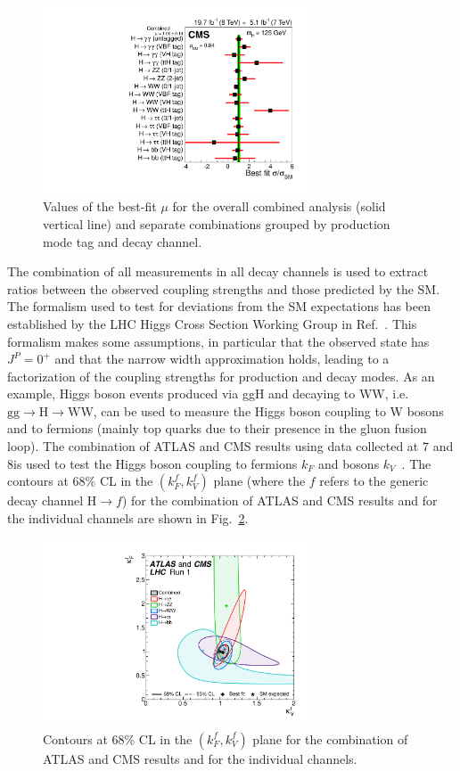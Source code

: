 \begin{figure}[htb]
\centering
\includegraphics[width=0.7\textwidth]{images/signal_strengths.pdf}
\caption{Values of the best-fit $\mu$ for the overall combined analysis (solid vertical line) and separate combinations grouped by production mode tag and decay channel.}\label{fig:signal_strengths}
\end{figure}
    
The combination of all measurements in all decay channels is used to extract ratios between the observed coupling strengths and those predicted by the SM. The formalism used to test for deviations from the SM expectations has been established by the LHC Higgs Cross Section Working Group in Ref.~\cite{Heinemeyer:2013tqa}. This formalism makes some assumptions, in particular that the observed state has $J^P =0^+$ and that the narrow width approximation holds, leading to a factorization of the coupling strengths for production and decay modes. As an example, Higgs boson events produced via ggH and decaying to WW, i.e. $\mathrm{gg\to H\to WW}$, can be used to measure the Higgs boson coupling to W bosons and to fermions (mainly top quarks due to their presence in the gluon fusion loop). The combination of ATLAS and CMS results using data collected at 7 and 8\TeV is used to test the Higgs boson coupling to fermions $k_F$ and bosons $k_V$~\cite{Khachatryan:2016vau}. The contours at 68\% CL in the $(k_F^f, k_V^f)$ plane (where the $f$ refers to the generic decay channel H$\to f$) for the combination of ATLAS and CMS results and for the individual channels are shown in Fig.~\ref{fig:couplings}.

\begin{figure}[htb]
\centering
\includegraphics[width=0.7\textwidth]{images/couplings.pdf}
\caption{Contours at 68\% CL in the $(k_F^f, k_V^f)$ plane for the combination of ATLAS and CMS results and for the individual channels.}\label{fig:couplings}
\end{figure}

